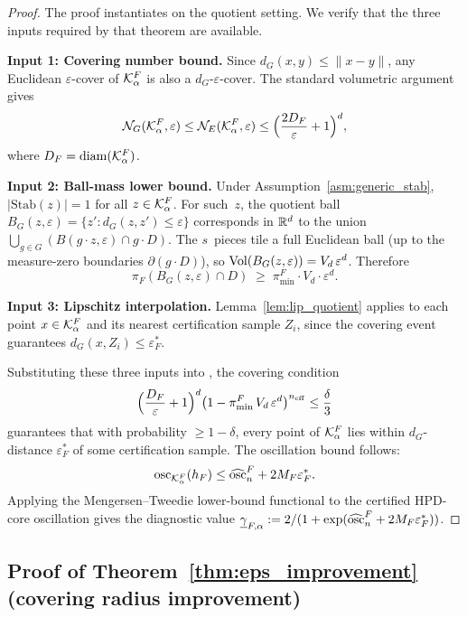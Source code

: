 \begin{proof}
  The proof instantiates \citet[Theorem~5.1]{LCNF} on the quotient
  setting.  We verify that the three inputs required by that
  theorem are available.

  \textbf{Input 1: Covering number bound.}
  Since $d_G(x,y) \leq \|x - y\|$, any Euclidean
  $\varepsilon$-cover of $\mathcal{K}_\alpha^F$ is also a
  $d_G$-$\varepsilon$-cover.  The standard volumetric argument
  gives
  \[
    \mathcal{N}_G(\mathcal{K}_\alpha^F, \varepsilon)
    \leq \mathcal{N}_E(\mathcal{K}_\alpha^F, \varepsilon)
    \leq \Bigl(\frac{2D_F}{\varepsilon} + 1\Bigr)^d,
  \]
  where $D_F = \mathrm{diam}(\mathcal{K}_\alpha^F)$.

  \textbf{Input 2: Ball-mass lower bound.}
  Under Assumption~\ref{asm:generic_stab},
  $|\mathrm{Stab}(z)| = 1$ for all $z \in \mathcal{K}_\alpha^F$.
  For such~$z$, the quotient ball
  $B_G(z, \varepsilon) = \{z' : d_G(z, z') \leq \varepsilon\}$
  corresponds in $\mathbb{R}^d$ to the union
  $\bigcup_{g \in G}(B(g \cdot z, \varepsilon) \cap g \cdot D)$.
  The $s$~pieces tile a full Euclidean ball (up to the
  measure-zero boundaries $\partial(g \cdot D)$), so
  $\mathrm{Vol}(B_G(z,\varepsilon)) = V_d\,\varepsilon^d$.  Therefore
  \[
    \pi_F(B_G(z,\varepsilon) \cap D)
    \;\geq\;
    \pi_{\min}^F \cdot V_d \cdot \varepsilon^d.
  \]

  \textbf{Input 3: Lipschitz interpolation.}
  Lemma~\ref{lem:lip_quotient} applies to each point $x \in \mathcal{K}_\alpha^F$
  and its nearest certification sample $Z_i$, since the covering event
  guarantees $d_G(x, Z_i) \leq \varepsilon_F^*$.

  Substituting these three inputs into
  \citet[Theorem~5.1]{LCNF}, the covering condition
  \[
    \Bigl(\frac{D_F}{\varepsilon} + 1\Bigr)^d
    \bigl(1 - \pi_{\min}^F\,V_d\,\varepsilon^d\bigr)^{n_{\mathrm{eff}}}
    \leq \frac{\delta}{3}
  \]
  guarantees that with probability $\geq 1 - \delta$,
  every point of $\mathcal{K}_\alpha^F$ lies within $d_G$-distance
  $\varepsilon_F^*$ of some certification sample.  The oscillation
  bound follows:
  \[
    \mathrm{osc}_{\mathcal{K}_\alpha^F}(h_F)
    \leq \widehat{\mathrm{osc}}_n^F + 2 M_F \varepsilon_F^*.
  \]
  Applying the Mengersen--Tweedie lower-bound functional to the
  certified HPD-core oscillation gives the diagnostic value
  $\underline{\gamma}_{F,\alpha}
  := 2/(1 + \exp(\widehat{\mathrm{osc}}_n^F + 2 M_F \varepsilon_F^*))$.
\end{proof}


\subsection{Proof of Theorem~\ref{thm:eps_improvement}
  (covering radius improvement)}
\label{app:proof_eps}

